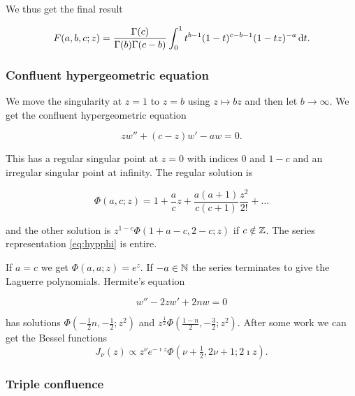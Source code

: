 \documentclass{notes}
\theoremstyle{plain}
\begin{document}
We thus get the final result

\begin{equation}\label{eq:Ffnint}
F(a,b,c;z) = \frac{\Gamma(c)}{\Gamma(b) \Gamma(c-b)} \int_0^1
t^{b-1} (1-t)^{c-b-1} (1-tz)^{-a}\, \mathrm{d} t.
\end{equation}

\subsubsection*{Confluent hypergeometric equation}

We move the singularity at $z=1$ to $z=b$ using $z \mapsto b z$ and then
let $b \to \infty$.  We get the confluent hypergeometric equation

\begin{equation}\label{eq:hypcon2}
z w'' + (c-z) w' - a w = 0.
\end{equation}

This has a regular singular point at $z=0$ with indices $0$ and $1-c$
and an irregular singular point at infinity.  The regular solution is

\begin{equation}\label{eq:hypphi}
\Phi(a,c;z) = 1+ \frac{a}{c} z + \frac{a (a+1)}{c (c+1)} \frac{z^2}{2!} + \dots
\end{equation}

and the other solution is $z^{1-c} \Phi(1+a-c,2-c;z)$ if $c \notin \mathbb{Z}$. The
series representation \eqref{eq:hypphi} is entire.

If $a=c$ we get $\Phi(a,a;z) = e^z$.  If $-a \in \mathbb{N}$ the series
terminates to give the Laguerre polynomials.  Hermite's equation

\begin{equation}\label{eq:hermite}
w'' - 2z w' + 2n w = 0
\end{equation}

has solutions $\Phi(-\tfrac{1}{2} n, -\tfrac{1}{2}; z^2)$ and
$z^{\frac{1}{2}} \Phi(\tfrac{1-n}{2}, -\tfrac{3}{2}; z^2)$.  After
some work we can get the Bessel functions
\begin{equation}\label{eq:hypbes}
J_\nu(z) \propto z^\nu e^{-\imath z} \Phi(\nu + \tfrac{1}{2}, 2\nu +1;
2 \imath z).
\end{equation}

\subsubsection*{Triple confluence}
\end{document}
